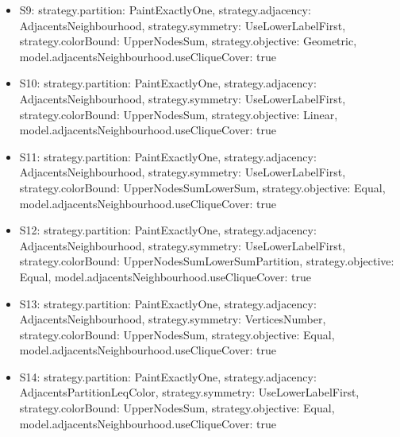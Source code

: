 \documentclass[landscape, 12pt]{report}
\begin{document}
\begin{itemize}
	\item S9: strategy.partition: PaintExactlyOne, strategy.adjacency: AdjacentsNeighbourhood, strategy.symmetry: UseLowerLabelFirst, strategy.colorBound: UpperNodesSum, strategy.objective: Geometric, model.adjacentsNeighbourhood.useCliqueCover: true
	\item S10: strategy.partition: PaintExactlyOne, strategy.adjacency: AdjacentsNeighbourhood, strategy.symmetry: UseLowerLabelFirst, strategy.colorBound: UpperNodesSum, strategy.objective: Linear, model.adjacentsNeighbourhood.useCliqueCover: true
	\item S11: strategy.partition: PaintExactlyOne, strategy.adjacency: AdjacentsNeighbourhood, strategy.symmetry: UseLowerLabelFirst, strategy.colorBound: UpperNodesSumLowerSum, strategy.objective: Equal, model.adjacentsNeighbourhood.useCliqueCover: true
	\item S12: strategy.partition: PaintExactlyOne, strategy.adjacency: AdjacentsNeighbourhood, strategy.symmetry: UseLowerLabelFirst, strategy.colorBound: UpperNodesSumLowerSumPartition, strategy.objective: Equal, model.adjacentsNeighbourhood.useCliqueCover: true
	\item S13: strategy.partition: PaintExactlyOne, strategy.adjacency: AdjacentsNeighbourhood, strategy.symmetry: VerticesNumber, strategy.colorBound: UpperNodesSum, strategy.objective: Equal, model.adjacentsNeighbourhood.useCliqueCover: true
	\item S14: strategy.partition: PaintExactlyOne, strategy.adjacency: AdjacentsPartitionLeqColor, strategy.symmetry: UseLowerLabelFirst, strategy.colorBound: UpperNodesSum, strategy.objective: Equal, model.adjacentsNeighbourhood.useCliqueCover: true
	\end{itemize}
\end{document}
